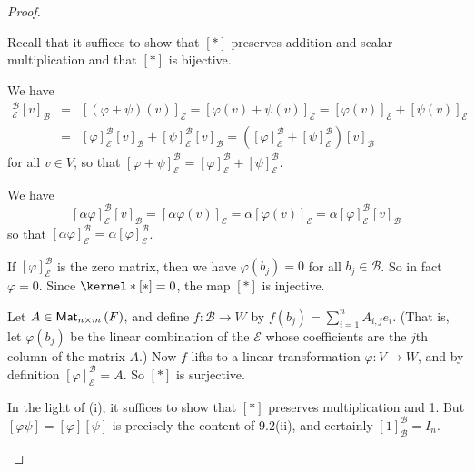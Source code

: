 \documentclass{memoir}
\begin{document}
\begin{proof} \mbox{}
\begin{enumerate*}
\item Recall that it suffices to show that $[\ast]$ preserves addition and scalar multiplication and that $[\ast]$ is bijective.
\begin{itemize*}
\item We have 
\begin{eqnarray*}
[\varphi + \psi]^\mathcal{B}_\mathcal{E} [v]_\mathcal{B} & = & [(\varphi+\psi)(v)]_\mathcal{E} = [\varphi(v) + \psi(v)]_\mathcal{E} = [\varphi(v)]_\mathcal{E} + [\psi(v)]_\mathcal{E} \\
 & = & [\varphi]^\mathcal{B}_\mathcal{E}[v]_\mathcal{B} + [\psi]^\mathcal{B}_\mathcal{E}[v]_\mathcal{B} = ([\varphi]^\mathcal{B}_\mathcal{E} + [\psi]^\mathcal{B}_\mathcal{E})[v]_\mathcal{B}
\end{eqnarray*}
for all $v \in V$, so that $[\varphi+\psi]^\mathcal{B}_\mathcal{E} = [\varphi]^\mathcal{B}_\mathcal{E} + [\psi]^\mathcal{B}_\mathcal{E}$.
\item We have \[ [\alpha\varphi]^\mathcal{B}_\mathcal{E} [v]_\mathcal{B} = [\alpha\varphi(v)]_\mathcal{E} = \alpha [\varphi(v)]_\mathcal{E} = \alpha [\varphi]^\mathcal{B}_\mathcal{E} [v]_\mathcal{B} \] so that $[\alpha\varphi]^\mathcal{B}_\mathcal{E} = \alpha [\varphi]^\mathcal{B}_\mathcal{E}$.
\item If $[\varphi]^\mathcal{B}_\mathcal{E}$ is the zero matrix, then we have $\varphi(b_j) = 0$ for all $b_j \in \mathcal{B}$. So in fact $\varphi = 0$. Since $\kernel*{[\ast]} = 0$, the map $[\ast]$ is injective.
\item Let $A \in {\mathsf{Mat}_{{n} \times {m}}}\left(F\right)$, and define $f : \mathcal{B} \rightarrow W$ by $f(b_j) = \sum_{i=1}^n A_{i,j} e_i$. (That is, let $\varphi(b_j)$ be the linear combination of the $\mathcal{E}$ whose coefficients are the $j$th column of the matrix $A$.) Now $f$ lifts to a linear transformation $\varphi : V \rightarrow W$, and by definition $[\varphi]^\mathcal{B}_\mathcal{E} = A$. So $[\ast]$ is surjective.
\end{itemize*}
\item In the light of (i), it suffices to show that $[\ast]$ preserves multiplication and 1. But $[\varphi\psi] = [\varphi][\psi]$ is precisely the content of 9.2(ii), and certainly $[1]^\mathcal{B}_\mathcal{B} = I_n$. \qedhere
\end{enumerate*}
\end{proof}
\end{document}
